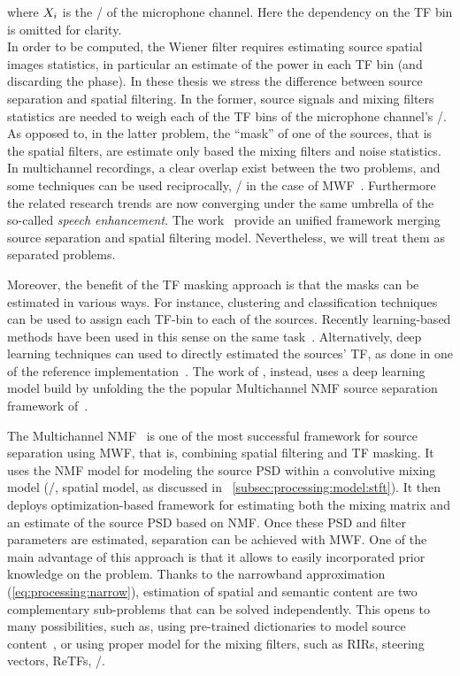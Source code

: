 where $X_{i}$ is the \STFT/ of the microphone channel.
Here the dependency on the \ac{TF} bin is omitted for clarity.
\\In order to be computed, the Wiener filter requires estimating source spatial images statistics, in particular an estimate of the power in each \ac{TF} bin (and discarding the phase).
In these thesis we stress the difference between source separation and spatial filtering.
In the former, source signals and mixing filters statistics are needed to weigh each of the \ac{TF} bins of the microphone channel's \STFT/.
As opposed to, in the latter problem, the ``mask'' of one of the sources, that is the spatial filters, are estimate only based the mixing filters and noise statistics.
\\In multichannel recordings, a clear overlap exist between the two problems, and some techniques can be used reciprocally, \eg/ in the case of \ac{MWF}~.
Furthermore the related research trends are now converging under the same umbrella of the so-called \textit{speech enhancement}.
The work~ provide an unified framework merging source separation and spatial filtering model.
Nevertheless, we will treat them as separated problems.

\mynewline
Moreover, the benefit of the \ac{TF} masking approach is that the masks can be estimated in various ways.
For instance, clustering and classification techniques~ can be used to assign each \ac{TF}-bin to each of the sources.
Recently learning-based methods have been used in this sense on the same task~.
Alternatively, deep learning techniques can used to directly estimated the sources' \ac{TF}, as done in one of the reference implementation~.
The work of , instead, uses a deep learning model build by unfolding the the popular Multichannel \ac{NMF} source separation framework of~.

\mynewline
The Multichannel \ac{NMF}~ is one of the most successful framework for source separation using \ac{MWF}, that is, combining spatial filtering and \ac{TF} masking.
It uses the \ac{NMF} model for modeling the source \ac{PSD} within a convolutive mixing model (\ie/, spatial model, as discussed in ~\cref{subsec:processing:model:stft}).
It then deploys optimization-based framework for estimating both the mixing matrix and an estimate of the source \ac{PSD} based on \ac{NMF}.
Once these \ac{PSD} and filter parameters are estimated, separation can be achieved with \ac{MWF}.
One of the main advantage of this approach is that it allows to easily incorporated prior knowledge on the problem.
Thanks to the narrowband approximation (\cref{eq:processing:narrow}), estimation of spatial and semantic content are two complementary sub-problems that can be solved independently.
This opens to many possibilities, such as, using pre-trained dictionaries to model source content~, or using proper model for the mixing filters, such as \acp{RIR}, steering vectors, \acp{ReTF}, \etc/.

